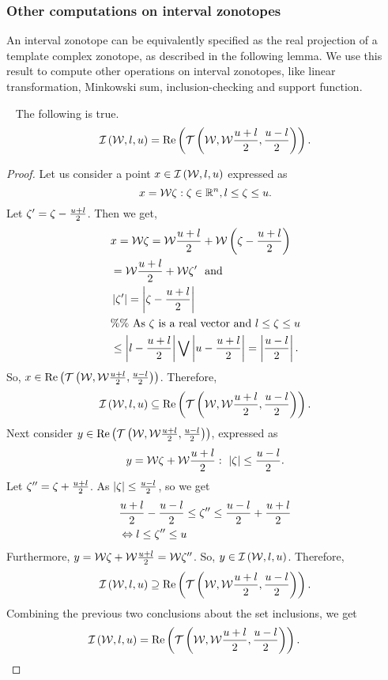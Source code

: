 \subsubsection*{Other computations on interval zonotopes}
%
An interval zonotope can be equivalently specified as the real
projection of a template complex zonotope, as described in the
following lemma.  We use this result to compute other operations on
interval zonotopes, like linear transformation, Minkowski sum,
inclusion-checking and support function.
%
\begin{lemma}~\label{lem:iz-tcz-conversion}
The following is true.
%
\[
\mathit{\operatorname{\mathcal{I}}}\left(\mathcal{W},l,u\right)=\operatorname{Re}\left(\mathit{\operatorname{\mathcal{T}}}\left(\mathcal{W},\mathcal{W}\frac{u+l}{2},\frac{u-l}{2}\right)\right).
\]
%
\end{lemma}
%
\begin{proof}
Let us consider a point $x\in\mathit{\operatorname{\mathcal{I}}}\left(\mathcal{W},l,u\right)$ expressed as
%
\[
x=\mathcal{W}\zeta:\zeta\in\mathbb{R}^n,l\leq\zeta\leq u.
\]
%
  Let $\zeta^\prime=
\zeta-\frac{u+l}{2}$.
Then we get,
%
\begin{align*}
& x=\mathcal{W}\zeta=\mathcal{W}\frac{u+l}{2}+\mathcal{W}\left(\zeta-\frac{u+l}{2}\right)\\
& = \mathcal{W}\frac{u+l}{2}+\mathcal{W}\zeta^\prime~~\text{and}\\
& \left|\zeta^\prime\right|=\left|\zeta-\frac{u+l}{2}\right|\\
& \%\%~\text{As $\zeta$ is a real vector and $l\leq\zeta\leq u$}\\
& \leq \left|l-\frac{u+l}{2}\right|\bigvee \left|u-\frac{u+l}{2}\right|
= \left|\frac{u-l}{2}\right|.
\end{align*}
%
So,
$x\in\operatorname{Re}\left(\mathit{\operatorname{\mathcal{T}}}\left(\mathcal{W},\mathcal{W}\frac{u+l}{2},\frac{u-l}{2}\right)\right)$.  Therefore,
%
\[
\mathit{\operatorname{\mathcal{I}}}\left(\mathcal{W},l,u\right)\subseteq\operatorname{Re}\left(\mathit{\operatorname{\mathcal{T}}}\left(\mathcal{W},\mathcal{W}\frac{u+l}{2},\frac{u-l}{2}\right)\right).
\]
%
Next consider $y\in\operatorname{Re}\left(\mathit{\operatorname{\mathcal{T}}}\left(\mathcal{W},\mathcal{W}\frac{u+l}{2},\frac{u-l}{2}\right)\right)$,
expressed as
\[
y=\mathcal{W}\zeta+\mathcal{W}\frac{u+l}{2}:~\left|\zeta\right|\leq\frac{u-l}{2}.
\]
%
Let $\zeta^{\prime\prime}=\zeta+\frac{u+l}{2}$.
As
$\left|\zeta\right|\leq\frac{u-l}{2}$, so we get
%
\begin{align*}
&
\frac{u+l}{2}-\frac{u-l}{2}\leq\zeta^{\prime\prime}\leq\frac{u-l}{2}+\frac{u+l}{2}\\
& \Leftrightarrow l\leq\zeta^{\prime\prime}\leq u
\end{align*}
%
Furthermore, $y=\mathcal{W}\zeta+\mathcal{W}\frac{u+l}{2}=\mathcal{W}\zeta^{\prime\prime}$.
So, $y\in\mathit{\operatorname{\mathcal{I}}}\left(\mathcal{W},l,u\right)$.  Therefore,
%
\[
\mathit{\operatorname{\mathcal{I}}}\left(\mathcal{W},l,u\right)\supseteq\operatorname{Re}\left(\mathit{\operatorname{\mathcal{T}}}\left(\mathcal{W},\mathcal{W}\frac{u+l}{2},\frac{u-l}{2}\right)\right).
\]
%
Combining the previous two conclusions about the set inclusions, we get
%
\[
\mathit{\operatorname{\mathcal{I}}}\left(\mathcal{W},l,u\right)=\operatorname{Re}\left(\mathit{\operatorname{\mathcal{T}}}\left(\mathcal{W},\mathcal{W}\frac{u+l}{2},\frac{u-l}{2}\right)\right).~~~~~~\qedhere
\]
%
\end{proof}
